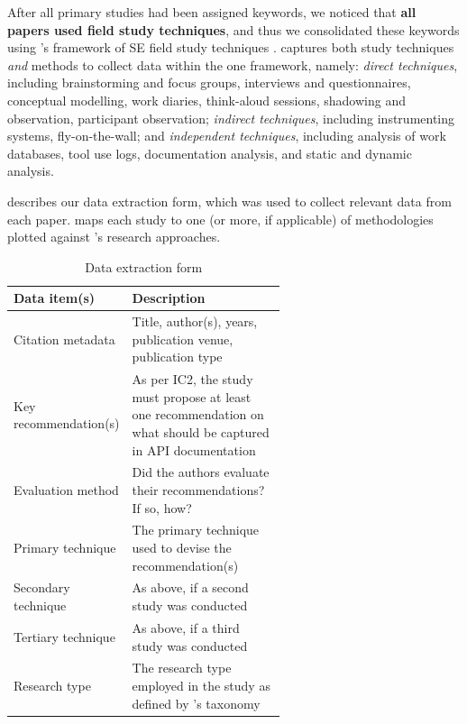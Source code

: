 After all primary studies had been assigned keywords, we noticed that \textbf{all papers used field study techniques}, and thus we consolidated these keywords using \citeauthor{Singer:2007tu}'s framework of SE field study techniques \citep{Singer:2007tu}. \citeauthor{Singer:2007tu} captures both study techniques \textit{and} methods to collect data within the one framework, namely: \textit{direct techniques}, including brainstorming and focus groups, interviews and questionnaires, conceptual modelling, work diaries, think-aloud sessions, shadowing and observation, participant observation; \textit{indirect techniques}, including instrumenting systems, fly-on-the-wall; and \textit{independent techniques}, including analysis of work databases, tool use logs, documentation analysis, and static and dynamic analysis. 

 describes our data extraction form, which was used to collect relevant data from each paper.  maps each study to one (or more, if applicable) of methodologies plotted against \citeauthor{Wieringa:2006vd}'s research approaches.

\begin{table}[tb]
  \caption{Data extraction form}
  \label{esem2019:tab:extraction}
  \centering
  \begin{tabular}{|l|p{0.6\linewidth}|}
    \hline
    \textbf{Data item(s)} &
    \textbf{Description}
    \\
    \hline
    \hline
    Citation metadata & Title, author(s), years, publication venue, publication type \\
    Key recommendation(s) & As per IC2, the study must propose at least one recommendation on what should be captured in API documentation \\
    Evaluation method & Did the authors evaluate their recommendations? If so, how? \\
    Primary technique & The primary technique used to devise the recommendation(s) \\ 
    Secondary technique & As above, if a second study was conducted \\
    Tertiary technique & As above, if a third study was conducted \\
    Research type & The research type employed in the study as defined by \citeauthor{Wieringa:2006vd}'s taxonomy \\
    \hline
  \end{tabular}
\end{table}


